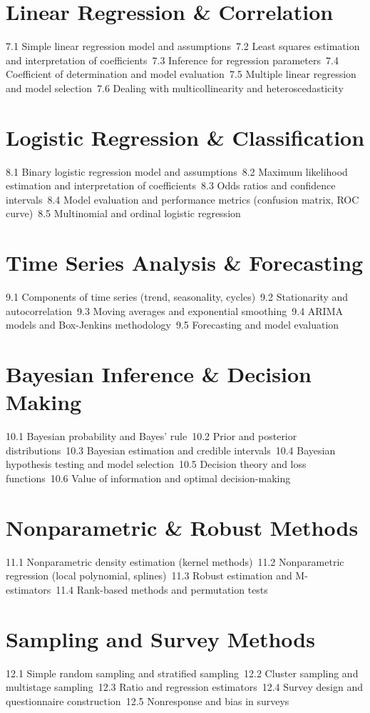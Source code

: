 \section{Linear Regression \& Correlation}
7.1 Simple linear regression model and assumptions\
7.2 Least squares estimation and interpretation of coefficients\
7.3 Inference for regression parameters\
7.4 Coefficient of determination and model evaluation\
7.5 Multiple linear regression and model selection\
7.6 Dealing with multicollinearity and heteroscedasticity\
\section{Logistic Regression \& Classification}
8.1 Binary logistic regression model and assumptions\
8.2 Maximum likelihood estimation and interpretation of coefficients\
8.3 Odds ratios and confidence intervals\
8.4 Model evaluation and performance metrics (confusion matrix, ROC curve)\
8.5 Multinomial and ordinal logistic regression\
\section{Time Series Analysis \& Forecasting}
9.1 Components of time series (trend, seasonality, cycles)\
9.2 Stationarity and autocorrelation\
9.3 Moving averages and exponential smoothing\
9.4 ARIMA models and Box-Jenkins methodology\
9.5 Forecasting and model evaluation\
\section{Bayesian Inference \& Decision Making}
10.1 Bayesian probability and Bayes' rule\
10.2 Prior and posterior distributions\
10.3 Bayesian estimation and credible intervals\
10.4 Bayesian hypothesis testing and model selection\
10.5 Decision theory and loss functions\
10.6 Value of information and optimal decision-making\
\section{Nonparametric \& Robust Methods}
11.1 Nonparametric density estimation (kernel methods)\
11.2 Nonparametric regression (local polynomial, splines)\
11.3 Robust estimation and M-estimators\
11.4 Rank-based methods and permutation tests\
\section{Sampling and Survey Methods}
12.1 Simple random sampling and stratified sampling\
12.2 Cluster sampling and multistage sampling\
12.3 Ratio and regression estimators\
12.4 Survey design and questionnaire construction\
12.5 Nonresponse and bias in surveys\
